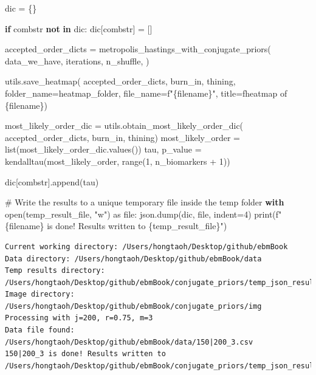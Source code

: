 \documentclass[
  letterpaper,
  DIV=11,
  numbers=noendperiod]{scrreprt}
\newenvironment{Shaded}{\begin{snugshade}}{\end{snugshade}}
\newcommand{\BuiltInTok}[1]{\textcolor[rgb]{0.00,0.23,0.31}{#1}}
\newcommand{\CommentTok}[1]{\textcolor[rgb]{0.37,0.37,0.37}{#1}}
\newcommand{\ControlFlowTok}[1]{\textcolor[rgb]{0.00,0.23,0.31}{\textbf{#1}}}
\newcommand{\DecValTok}[1]{\textcolor[rgb]{0.68,0.00,0.00}{#1}}
\newcommand{\ImportTok}[1]{\textcolor[rgb]{0.00,0.46,0.62}{#1}}
\newcommand{\KeywordTok}[1]{\textcolor[rgb]{0.00,0.23,0.31}{\textbf{#1}}}
\newcommand{\NormalTok}[1]{\textcolor[rgb]{0.00,0.23,0.31}{#1}}
\newcommand{\OperatorTok}[1]{\textcolor[rgb]{0.37,0.37,0.37}{#1}}
\newcommand{\SpecialCharTok}[1]{\textcolor[rgb]{0.37,0.37,0.37}{#1}}
\newcommand{\SpecialStringTok}[1]{\textcolor[rgb]{0.13,0.47,0.30}{#1}}
\newcommand{\StringTok}[1]{\textcolor[rgb]{0.13,0.47,0.30}{#1}}
\begin{document}
\begin{Shaded}
\begin{Highlighting}[]
\NormalTok{    dic }\OperatorTok{=}\NormalTok{ \{\}}

    \ControlFlowTok{if}\NormalTok{ combstr }\KeywordTok{not} \KeywordTok{in}\NormalTok{ dic:}
\NormalTok{        dic[combstr] }\OperatorTok{=}\NormalTok{ []}

\NormalTok{    accepted\_order\_dicts }\OperatorTok{=}\NormalTok{ metropolis\_hastings\_with\_conjugate\_priors(}
\NormalTok{        data\_we\_have,}
\NormalTok{        iterations,}
\NormalTok{        n\_shuffle,}
\NormalTok{    )}

\NormalTok{    utils.save\_heatmap(}
\NormalTok{        accepted\_order\_dicts,}
\NormalTok{        burn\_in, }
\NormalTok{        thining, }
\NormalTok{        folder\_name}\OperatorTok{=}\NormalTok{heatmap\_folder,}
\NormalTok{        file\_name}\OperatorTok{=}\SpecialStringTok{f"}\SpecialCharTok{\{}\NormalTok{filename}\SpecialCharTok{\}}\SpecialStringTok{"}\NormalTok{, }
\NormalTok{        title}\OperatorTok{=}\SpecialStringTok{f\textquotesingle{}heatmap of }\SpecialCharTok{\{}\NormalTok{filename}\SpecialCharTok{\}}\SpecialStringTok{\textquotesingle{}}\NormalTok{)}
    
\NormalTok{    most\_likely\_order\_dic }\OperatorTok{=}\NormalTok{ utils.obtain\_most\_likely\_order\_dic(}
\NormalTok{        accepted\_order\_dicts, burn\_in, thining)}
\NormalTok{    most\_likely\_order }\OperatorTok{=} \BuiltInTok{list}\NormalTok{(most\_likely\_order\_dic.values())}
\NormalTok{    tau, p\_value }\OperatorTok{=}\NormalTok{ kendalltau(most\_likely\_order, }\BuiltInTok{range}\NormalTok{(}\DecValTok{1}\NormalTok{, n\_biomarkers }\OperatorTok{+} \DecValTok{1}\NormalTok{))}
    
\NormalTok{    dic[combstr].append(tau)}
    
    \CommentTok{\# Write the results to a unique temporary file inside the temp folder}
    \ControlFlowTok{with} \BuiltInTok{open}\NormalTok{(temp\_result\_file, }\StringTok{"w"}\NormalTok{) }\ImportTok{as} \BuiltInTok{file}\NormalTok{:}
\NormalTok{        json.dump(dic, }\BuiltInTok{file}\NormalTok{, indent}\OperatorTok{=}\DecValTok{4}\NormalTok{)}
    \BuiltInTok{print}\NormalTok{(}\SpecialStringTok{f"}\SpecialCharTok{\{}\NormalTok{filename}\SpecialCharTok{\}}\SpecialStringTok{ is done! Results written to }\SpecialCharTok{\{}\NormalTok{temp\_result\_file}\SpecialCharTok{\}}\SpecialStringTok{"}\NormalTok{)}
\end{Highlighting}
\end{Shaded}

\begin{verbatim}
Current working directory: /Users/hongtaoh/Desktop/github/ebmBook
Data directory: /Users/hongtaoh/Desktop/github/ebmBook/data
Temp results directory: /Users/hongtaoh/Desktop/github/ebmBook/conjugate_priors/temp_json_results
Image directory: /Users/hongtaoh/Desktop/github/ebmBook/conjugate_priors/img
Processing with j=200, r=0.75, m=3
Data file found: /Users/hongtaoh/Desktop/github/ebmBook/data/150|200_3.csv
150|200_3 is done! Results written to /Users/hongtaoh/Desktop/github/ebmBook/conjugate_priors/temp_json_results/temp_results_200_0.75_3.json
\end{verbatim}
\end{document}
